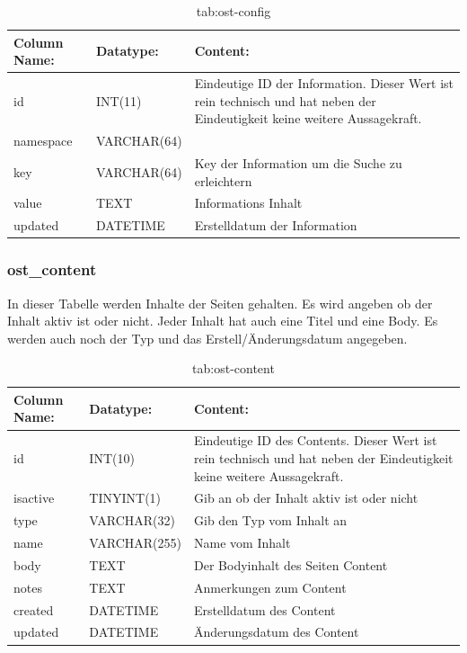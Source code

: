 \begin{table}[h]
	\begin{tabular}{|p{3cm}|p{4cm}|p{7.7cm}|}
		\hline
		\textbf{Column Name:} & \textbf{Datatype:} & \textbf{Content:}\\
		\hline
		id & INT(11) & Eindeutige ID der Information. Dieser Wert ist rein technisch und hat  neben der Eindeutigkeit keine weitere 
		Aussagekraft. \\
		\hline
		namespace & VARCHAR(64) & \\
		\hline
		key & VARCHAR(64) & Key der Information um die Suche zu erleichtern\\
		\hline
		value & TEXT & Informations Inhalt\\
		\hline
		updated & DATETIME & Erstelldatum der Information\\
		\hline
	\end{tabular}
	\caption{tab:ost-config}
\end{table}
\label{tab:ost_config}


\newpage
\subsubsection{ost\_content}

In dieser Tabelle werden Inhalte der Seiten gehalten. Es wird angeben ob der Inhalt aktiv ist oder nicht. Jeder Inhalt hat auch eine Titel und eine Body. Es werden auch noch der Typ und das Erstell/Änderungsdatum angegeben.

\begin{table}[h]
	\begin{tabular}{|p{3cm}|p{4cm}|p{7.7cm}|}
		\hline
		\textbf{Column Name:} & \textbf{Datatype:} & \textbf{Content:}\\
		\hline
		id & INT(10) & Eindeutige ID des Contents. Dieser Wert ist rein technisch und hat  neben der Eindeutigkeit keine weitere 
		Aussagekraft.\\
		\hline
		isactive & TINYINT(1) & Gib an ob der Inhalt aktiv ist oder nicht\\
		\hline
		type & VARCHAR(32) & Gib den Typ vom Inhalt an\\
		\hline
		name & VARCHAR(255) & Name vom Inhalt\\
		\hline
		body & TEXT & Der Bodyinhalt des Seiten Content\\
		\hline
		notes & TEXT & Anmerkungen zum Content\\
		\hline
		created & DATETIME & Erstelldatum des Content\\
		\hline
		updated & DATETIME & Änderungsdatum des Content\\
		\hline
	\end{tabular}
	\caption{tab:ost-content}
\end{table}
\label{tab:ost_content}

